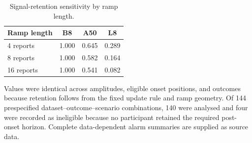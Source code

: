 \documentclass[pdflatex,sn-vancouver-num]{sn-jnl}
\begin{document}
\begin{table}[!htbp]
\caption{Signal-retention sensitivity by ramp length.}\label{tab:s7}
\centering\small
\begin{tabular}{@{}lccc@{}}
\toprule
Ramp length & B8 & A50 & L8\\
\midrule
4 reports & 1.000 & 0.645 & 0.289\\
8 reports & 1.000 & 0.582 & 0.164\\
16 reports & 1.000 & 0.541 & 0.082\\
\bottomrule
\end{tabular}
\begin{flushleft}\footnotesize Values were identical across amplitudes, eligible onset positions, and outcomes because retention follows from the fixed update rule and ramp geometry. Of 144 prespecified dataset--outcome--scenario combinations, 140 were analysed and four were recorded as ineligible because no participant retained the required post-onset horizon. Complete data-dependent alarm summaries are supplied as source data.\end{flushleft}
\end{table}
\end{document}
